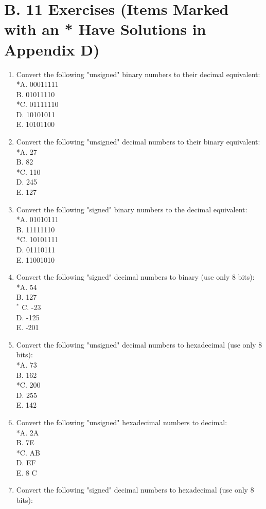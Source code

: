 \documentclass[10pt]{book}
\begin{document}
\section{B. 11 Exercises (Items Marked with an * Have Solutions in Appendix D)}
\begin{enumerate}
  \item Convert the following "unsigned" binary numbers to their decimal equivalent:\\
*A. 00011111\\
B. 01011110\\
*C. 01111110\\
D. 10101011\\
E. 10101100
  \item Convert the following "unsigned" decimal numbers to their binary equivalent:\\
*A. 27\\
B. 82\\
*C. 110\\
D. 245\\
E. 127
  \item Convert the following "signed" binary numbers to the decimal equivalent:\\
*A. 01010111\\
B. 11111110\\
*C. 10101111\\
D. 01110111\\
E. 11001010
  \item Convert the following "signed" decimal numbers to binary (use only 8 bits):\\
*A. 54\\
B. 127\\
${ }^{*}$ C. -23\\
D. -125\\
E. -201
  \item Convert the following "unsigned" decimal numbers to hexadecimal (use only 8 bits):\\
*A. 73\\
B. 162\\
*C. 200\\
D. 255\\
E. 142
  \item Convert the following "unsigned" hexadecimal numbers to decimal:\\
*A. 2A\\
B. 7E\\
*C. AB\\
D. EF\\
E. 8 C
  \item Convert the following "signed" decimal numbers to hexadecimal (use only 8 bits):\\

\end{enumerate}
\end{document}
